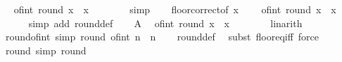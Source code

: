 \begin{isabellebody}
\ \isamarkupfalse%
\ {\isachardoublequoteopen}of{\isacharunderscore}{\kern0pt}int\ {\isacharparenleft}{\kern0pt}round\ x{\isacharparenright}{\kern0pt}\ {\isasymge}\ x\ {\isacharminus}{\kern0pt}\ {}{\isacharslash}{\kern0pt}{}{\isachardoublequoteclose}\isanewline
\ \ \ \ \isamarkupfalse%
\ simp\isanewline
\ \ \isamarkupfalse%
\ floor{\isacharunderscore}{\kern0pt}correct{\isacharbrackleft}{\kern0pt}of\ {\isachardoublequoteopen}x\ {\isacharplus}{\kern0pt}\ {}{\isacharslash}{\kern0pt}{}{\isachardoublequoteclose}{\isacharbrackright}{\kern0pt}\ \isamarkupfalse%
\ {\isachardoublequoteopen}of{\isacharunderscore}{\kern0pt}int\ {\isacharparenleft}{\kern0pt}round\ x{\isacharparenright}{\kern0pt}\ {\isasymle}\ x\ {\isacharplus}{\kern0pt}\ {}{\isacharslash}{\kern0pt}{}{\isachardoublequoteclose}\isanewline
\ \ \ \ \isamarkupfalse%
\ {\isacharparenleft}{\kern0pt}simp\ add{\isacharcolon}{\kern0pt}\ round{\isacharunderscore}{\kern0pt}def{\isacharparenright}{\kern0pt}\isanewline
\ \ \isamarkupfalse%
\ A\ \isamarkupfalse%
\ {\isachardoublequoteopen}{\isasymbar}of{\isacharunderscore}{\kern0pt}int\ {\isacharparenleft}{\kern0pt}round\ x{\isacharparenright}{\kern0pt}\ {\isacharminus}{\kern0pt}\ x{\isasymbar}\ {\isasymle}\ {}{\isacharslash}{\kern0pt}{}{\isachardoublequoteclose}\isanewline
\ \ \ \ \isamarkupfalse%
\ linarith\isanewline
{}\isamarkupfalse%
%
\endisatagproof
{\isafoldproof}%
%
\isadelimproof
\isanewline
%
\endisadelimproof
\isanewline
{}\isamarkupfalse%
\ round{\isacharunderscore}{\kern0pt}of{\isacharunderscore}{\kern0pt}int\ {\isacharbrackleft}{\kern0pt}simp{\isacharbrackright}{\kern0pt}{\isacharcolon}{\kern0pt}\ {\isachardoublequoteopen}round\ {\isacharparenleft}{\kern0pt}of{\isacharunderscore}{\kern0pt}int\ n{\isacharparenright}{\kern0pt}\ {\isacharequal}{\kern0pt}\ n{\isachardoublequoteclose}\isanewline
%
\isadelimproof
\ \ %
\endisadelimproof
%
\isatagproof
{}\isamarkupfalse%
\ round{\isacharunderscore}{\kern0pt}def\ \isamarkupfalse%
\ {\isacharparenleft}{\kern0pt}subst\ floor{\isacharunderscore}{\kern0pt}eq{\isacharunderscore}{\kern0pt}iff{\isacharparenright}{\kern0pt}\ force%
\endisatagproof
{\isafoldproof}%
%
\isadelimproof
\isanewline
%
\endisadelimproof
\isanewline
{}\isamarkupfalse%
\ round{\isacharunderscore}{\kern0pt}{}\ {\isacharbrackleft}{\kern0pt}simp{\isacharbrackright}{\kern0pt}{\isacharcolon}{\kern0pt}\ {\isachardoublequoteopen}round\ {}\ {\isacharequal}{\kern0pt}\ {}{\isachardoublequoteclose}\isanewline

\end{isabellebody}
